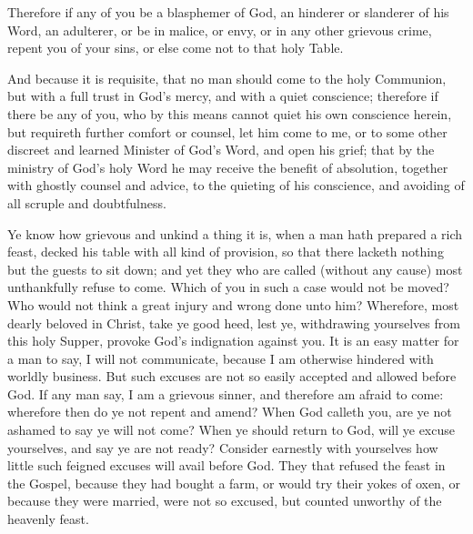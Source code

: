 Therefore if any of you be a blasphemer of God, an hinderer or slanderer of his Word, an adulterer, or be in malice, or envy, or in any other grievous crime, repent you of your sins, or else come not to that holy Table.

And because it is requisite, that no man should come to the holy Communion, but with a full trust in God's mercy, and with a quiet conscience; therefore if there be any of you, who by this means cannot quiet his own conscience herein, but requireth further comfort or counsel, let him come to me, or to some other discreet and learned Minister of God's Word, and open his grief; that by the ministry of God's holy Word he may receive the benefit of absolution, together with ghostly counsel and advice, to the quieting of his conscience, and avoiding of all scruple and doubtfulness.


\medskip

{\centering{}\par}



Ye know how grievous and unkind a thing it is, when a man hath prepared a rich feast, decked his table with all kind of provision, so that there lacketh nothing but the guests to sit down; and yet they who are called (without any cause) most unthankfully refuse to come. Which of you in such a case would not be moved? Who would not think a great injury and wrong done unto him? Wherefore, most dearly beloved in Christ, take ye good heed, lest ye, withdrawing yourselves from this holy Supper, provoke God’s indignation against you. It is an easy matter for a man to say, I will not communicate, because I am otherwise hindered with worldly business. But such excuses are not so easily accepted and allowed before God. If any man say, I am a grievous sinner, and therefore am afraid to come: wherefore then do ye not repent and amend? When God calleth you, are ye not ashamed to say ye will not come? When ye should return to God, will ye excuse yourselves, and say ye are not ready? Consider earnestly with yourselves how little such feigned excuses will avail before God. They that refused the feast in the Gospel, because they had bought a farm, or would try their yokes of oxen, or because they were married, were not so excused, but counted unworthy of the heavenly feast.

